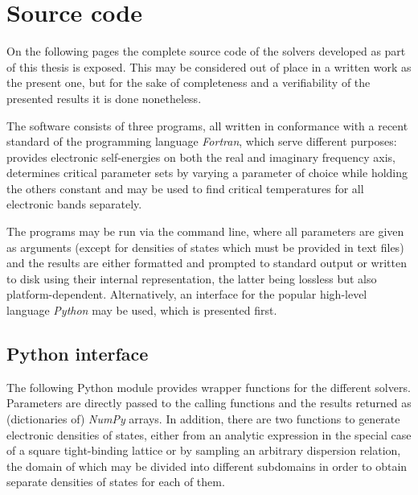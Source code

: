 
\def\path{../../ebmb}

\chapter{Source code}
\label{source code}

On the following pages the complete source code of the  solvers
developed as part of this thesis is exposed. This may be considered out of place
in a written work as the present one, but for the sake of completeness and a
verifiability of the presented results it is done nonetheless.

The software consists of three programs, all written in conformance with a
recent standard of the programming language \emph{Fortran}, which serve
different purposes:  provides electronic self-energies on both the
real and imaginary frequency axis,  determines critical parameter
sets by varying a parameter of choice while holding the others constant and
 may be used to find critical temperatures for all electronic bands
separately.

The programs may be run via the command line, where all parameters are given as
arguments (except for densities of states which must be provided in text files)
and the results are either formatted and prompted to standard output or written
to disk using their internal representation, the latter being lossless but also
platform-dependent. Alternatively, an interface for the popular high-level
language \emph{Python} may be used, which is presented first.

\section{Python interface}
\label{Python interface}

The following Python module provides wrapper functions for the different
 solvers. Parameters are directly passed to the calling
functions and the results returned as (dictionaries of) \emph{NumPy} arrays. In
addition, there are two functions to generate electronic densities of states,
either from an analytic expression in the special case of a square tight-binding
lattice or by sampling an arbitrary dispersion relation, the domain of which may
be divided into different subdomains in order to obtain separate densities of
states for each of them.



